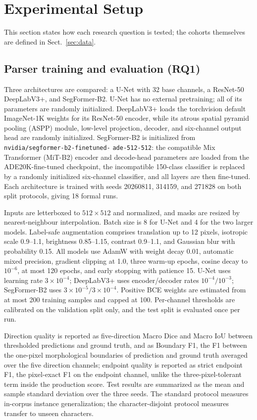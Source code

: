 \section{Experimental Setup}
\label{sec:setup}

This section states how each research question is tested; the cohorts
themselves are defined in Sect.~\ref{sec:data}.

\subsection{Parser training and evaluation (RQ1)}
\label{sec:setup-parser}

Three architectures are compared: a U-Net with 32 base channels, a ResNet-50
DeepLabV3+, and SegFormer-B2. U-Net has no external pretraining; all of its parameters are randomly
initialized. DeepLabV3+ loads the torchvision default ImageNet-1K weights for
its ResNet-50 encoder, while its atrous spatial pyramid pooling (ASPP)
module, low-level projection, decoder,
and six-channel output head are randomly initialized. SegFormer-B2 is
initialized from \texttt{nvidia/segformer-b2-finetuned-}\allowbreak
\texttt{ade-512-512}: the compatible Mix Transformer (MiT-B2) encoder and decode-head
parameters are loaded from the ADE20K-fine-tuned checkpoint, the incompatible
150-class classifier is replaced by a randomly initialized six-channel
classifier, and all layers are then fine-tuned. Each architecture is trained
with seeds 20260811, 314159, and 271828 on both split protocols, giving 18
formal runs.

Inputs are letterboxed to \(512\times512\) and normalized, and masks are
resized by nearest-neighbour interpolation. Batch size is 8 for U-Net and 4 for the two
larger models. Label-safe augmentation comprises translation up to 12
pixels, isotropic scale 0.9--1.1, brightness 0.85--1.15, contrast 0.9--1.1,
and Gaussian blur with probability 0.15. All models use AdamW with weight
decay 0.01, automatic mixed precision, gradient clipping at 1.0, three
warm-up epochs, cosine decay to \(10^{-6}\), at most 120 epochs, and early
stopping with patience 15. U-Net uses learning rate \(3\times10^{-4}\);
DeepLabV3+ uses encoder/decoder rates \(10^{-4}/10^{-3}\); SegFormer-B2 uses
\(3\times10^{-5}/3\times10^{-4}\). Positive BCE weights are estimated from at
most 200 training samples and capped at 100. Per-channel thresholds are
calibrated on the validation split only, and the test split is evaluated
once per run.

Direction quality is reported as five-direction Macro Dice and Macro IoU
between thresholded predictions and ground truth, and as Boundary F1, the F1
between the one-pixel morphological boundaries of prediction and ground
truth averaged over the five direction channels; endpoint quality is
reported as strict endpoint F1, the pixel-exact F1 on the endpoint channel,
unlike the three-pixel-tolerant term inside the production score. Test results are summarized as the mean and sample standard deviation
over the three seeds. The standard protocol measures in-corpus instance
generalization; the character-disjoint protocol measures transfer to unseen
characters.

